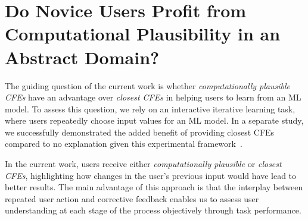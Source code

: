 
\section{Do Novice Users Profit from Computational Plausibility in an Abstract Domain?}\label{sec:hypotheses}


The guiding question of the current work is whether \textit{computationally plausible \glspl{CFE}} have an advantage over \textit{closest \glspl{CFE}} in helping users to learn from an \gls{ML} model.
To assess this question, we rely on an interactive iterative learning task, where users repeatedly choose input values for an \gls{ML} model.
In a separate study, we successfully demonstrated the added benefit of providing closest \glspl{CFE} compared to no explanation given this experimental framework~\citep{IAZ ARXIV}.

In the current work, users receive either \textit{computationally plausible} or \textit{closest \glspl{CFE}}, highlighting how changes in the user's previous input would have lead to better results.
The main advantage of this approach is that the interplay between repeated user action and corrective feedback enables us to assess user understanding at each stage of the process objectively through task performance.

